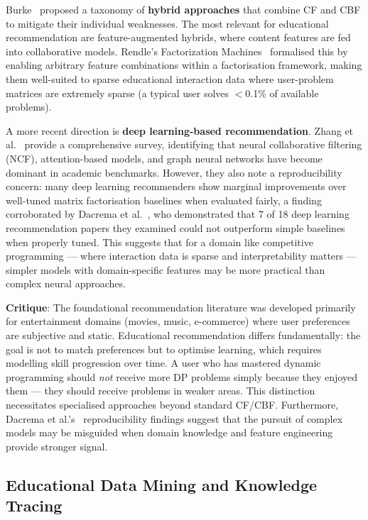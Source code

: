 \documentclass[12pt,a4paper]{article}
\begin{document}
Burke~\cite{burke2002} proposed a taxonomy of \textbf{hybrid approaches} that combine CF and CBF to mitigate their individual weaknesses. The most relevant for educational recommendation are feature-augmented hybrids, where content features are fed into collaborative models. Rendle's Factorization Machines~\cite{rendle2010} formalised this by enabling arbitrary feature combinations within a factorisation framework, making them well-suited to sparse educational interaction data where user-problem matrices are extremely sparse (a typical user solves $<$0.1\% of available problems).

A more recent direction is \textbf{deep learning-based recommendation}. Zhang et al.~\cite{zhang2019} provide a comprehensive survey, identifying that neural collaborative filtering (NCF), attention-based models, and graph neural networks have become dominant in academic benchmarks. However, they also note a reproducibility concern: many deep learning recommenders show marginal improvements over well-tuned matrix factorisation baselines when evaluated fairly, a finding corroborated by Dacrema et al.~\cite{dacrema2019}, who demonstrated that 7 of 18 deep learning recommendation papers they examined could not outperform simple baselines when properly tuned. This suggests that for a domain like competitive programming --- where interaction data is sparse and interpretability matters --- simpler models with domain-specific features may be more practical than complex neural approaches.

\textbf{Critique}: The foundational recommendation literature was developed primarily for entertainment domains (movies, music, e-commerce) where user preferences are subjective and static. Educational recommendation differs fundamentally: the goal is not to match preferences but to optimise learning, which requires modelling skill progression over time. A user who has mastered dynamic programming should \emph{not} receive more DP problems simply because they enjoyed them --- they should receive problems in weaker areas. This distinction necessitates specialised approaches beyond standard CF/CBF. Furthermore, Dacrema et al.'s~\cite{dacrema2019} reproducibility findings suggest that the pursuit of complex models may be misguided when domain knowledge and feature engineering provide stronger signal.

\subsection{Educational Data Mining and Knowledge Tracing}
\end{document}
